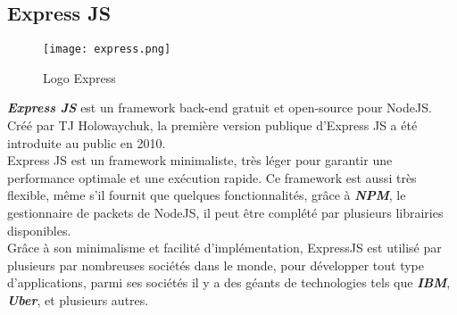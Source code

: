 \subsection{Express JS}
\vspace{1cm}
\begin{figure}[H]
    \centering
    \texttt{[image: express.png]}
    \vspace{1cm}
    \captionsetup{justification=centering}

    \caption{Logo Express}
    \label{fig:express_logo}
\end{figure}
\textit{\textbf{Express JS}} \cite{expressjs} est un framework back-end gratuit et open-source pour NodeJS. Créé par TJ Holowaychuk, la première version publique d'Express JS a été introduite au public en 2010.\\
Express JS est un framework minimaliste, très léger pour garantir une performance optimale et une exécution rapide. Ce framework est aussi très flexible, même s'il fournit que quelques fonctionnalités, grâce à \textit{\textbf{NPM}}, le gestionnaire de packets de NodeJS, il peut être complété par plusieurs librairies disponibles.\\
\noindent Grâce à son minimalisme et facilité d'implémentation, ExpressJS est utilisé par plusieurs par nombreuses sociétés dans le monde, pour développer tout type d'applications, parmi ses sociétés il y a des géants de technologies tels que \textit{\textbf{IBM}}, \textit{\textbf{Uber}}, et plusieurs autres.
